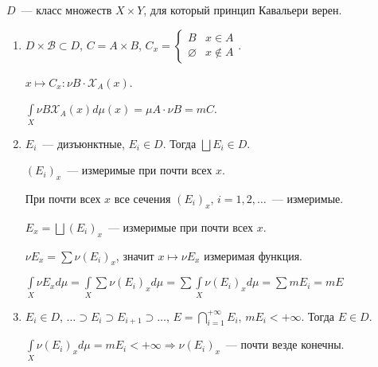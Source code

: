 \documentclass{article}
\begin{document}
            $D$~--- класс множеств $X \times Y$, для который принцип Кавальери верен.
            
            \begin{enumerate}
            
                \item $D \times \mathcal{B} \subset D$, $C = A \times B$, $C_x = 
                                                                        \begin{cases}
                                                                            B & x \in A \\ 
                                                                            \varnothing & x \notin A
                                                                        \end{cases}$.
                
                    $x \longmapsto C_x: \nu B \cdot \mathcal{X}_A(x)$.
                    
                    $\int\limits_{X} \nu B \mathcal{X}_A(x) d \mu(x) = \mu A \cdot \nu B = m C$.
                    
                \item $E_i$~--- дизъюнктные, $E_i \in D$. Тогда $\bigsqcup E_i \in D$.
                
                    $(E_i)_x$~--- измеримые при почти всех $x$. 
                    
                    При почти всех $x$ все сечения $(E_i)_x$, $i = 1, 2, \ldots$~--- измеримые.
                    
                    $E_x = \bigsqcup (E_i)_x$~--- измеримые при почти всех $x$.
                    
                    $\nu E_x = \sum \nu (E_i)_x$, значит $x \mapsto \nu E_x$ измеримая функция.
                    
                    $\int\limits_{X} \nu E_x d \mu = \int\limits_{X} \sum \nu (E_i)_x d \mu = \sum \int\limits_{X} \nu (E_i)_x d \mu = \sum m E_i = m E$
                
                \item $E_i \in D$, $\ldots \supset E_i \supset E_{i + 1} \supset \ldots$, $E = \bigcap\limits^{+\infty}_{i = 1} E_i$, $m E_i < +\infty$. Тогда $E \in D$.
                
                    $\int\limits_{X} \nu (E_i)_x d\mu = m E_i < +\infty \Rightarrow \nu (E_i)_x$~--- почти везде конечны.
                    

\end{enumerate}
\end{document}
